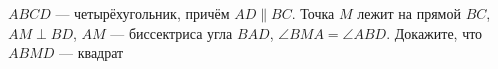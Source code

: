 $ABCD$ --- четырёхугольник, причём $AD\parallel BC$. 
Точка $M$ лежит на прямой $BC$, $AM \perp BD$, 
$AM$ --- биссектриса угла $BAD$, $\angle BMA = \angle ABD$.
Докажите, что $ABMD$ --- квадрат